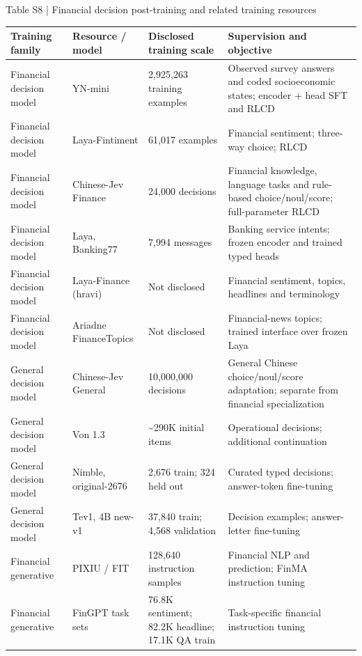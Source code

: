\documentclass[10pt]{article}
\begin{document}
\begin{center}
\begin{minipage}{\textwidth}
\fontsize{8.5}{10.3}\selectfont
Table S8 | Financial decision post-training and related training resources
\par\vspace{4pt}
\begin{tabularx}{\textwidth}{@{}XXXX@{}}
\toprule
Training family & Resource / model & Disclosed training scale & Supervision and objective \\
\midrule
Financial decision model & YN-mini & 2,925,263 training examples & Observed survey answers and coded socioeconomic states; encoder + head SFT and RLCD \\
Financial decision model & Laya-Fintiment & 61,017 examples & Financial sentiment; three-way choice; RLCD \\
Financial decision model & Chinese-Jev Finance & 24,000 decisions & Financial knowledge, language tasks and rule-based choice/noul/score; full-parameter RLCD \\
Financial decision model & Laya, Banking77 & 7,994 messages & Banking service intents; frozen encoder and trained typed heads \\
Financial decision model & Laya-Finance (hravi) & Not disclosed & Financial sentiment, topics, headlines and terminology \\
Financial decision model & Ariadne FinanceTopics & Not disclosed & Financial-news topics; trained interface over frozen Laya \\
General decision model & Chinese-Jev General & 10,000,000 decisions & General Chinese choice/noul/score adaptation; separate from financial specialization \\
General decision model & Von 1.3 & \textasciitilde{}290K initial items & Operational decisions; additional continuation \\
General decision model & Nimble, original-2676 & 2,676 train; 324 held out & Curated typed decisions; answer-token fine-tuning \\
General decision model & Tev1, 4B new-v1 & 37,840 train; 4,568 validation & Decision examples; answer-letter fine-tuning \\
Financial generative & PIXIU / FIT & 128,640 instruction samples & Financial NLP and prediction; FinMA instruction tuning \\
Financial generative & FinGPT task sets & 76.8K sentiment; 82.2K headline; 17.1K QA train & Task-specific financial instruction tuning \\

\end{tabularx}
\end{minipage}
\end{center}
\end{document}
